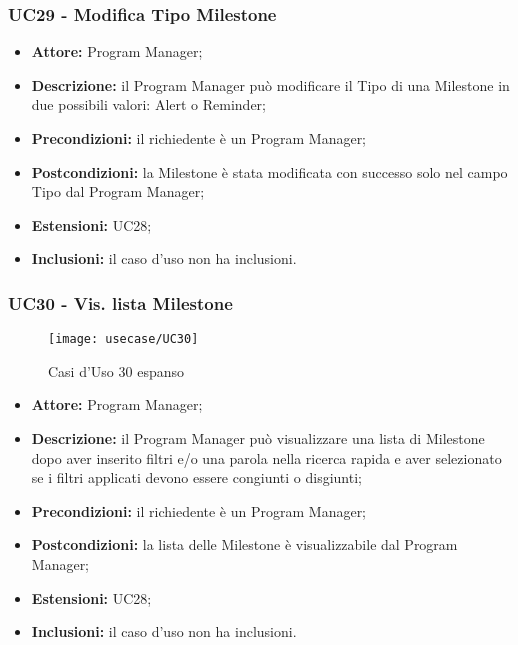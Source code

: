 \subsubsection*{UC29 - Modifica Tipo Milestone}
\begin{itemize}[label=$\circ$]
\item \textbf{Attore:} Program Manager;
\item \textbf{Descrizione:}  il Program Manager può modificare il Tipo di una Milestone in due possibili valori: Alert o Reminder;
\item \textbf{Precondizioni:} il richiedente è un Program Manager;
\item \textbf{Postcondizioni:} la Milestone è stata modificata con successo solo nel campo
Tipo dal Program Manager;
\item \textbf{Estensioni:} UC28;
\item \textbf{Inclusioni:} il caso d'uso non ha inclusioni.
\end{itemize}

\subsubsection*{UC30 - Vis. lista Milestone}
\begin{figure}[H] 
    \centering 
    \texttt{[image: usecase/UC30]} 
    \caption{Casi d'Uso 30 espanso}
\end{figure}
\begin{itemize}[label=$\circ$]
\item \textbf{Attore:} Program Manager;
\item \textbf{Descrizione:} il Program Manager può visualizzare una lista di Milestone dopo aver inserito filtri e/o una parola nella ricerca rapida e aver selezionato se i filtri applicati devono essere congiunti o disgiunti;
\item \textbf{Precondizioni:} il richiedente è un Program Manager;
\item \textbf{Postcondizioni:} la lista delle Milestone è visualizzabile dal Program Manager;
\item \textbf{Estensioni:} UC28;
\item \textbf{Inclusioni:} il caso d'uso non ha inclusioni.
\end{itemize}

